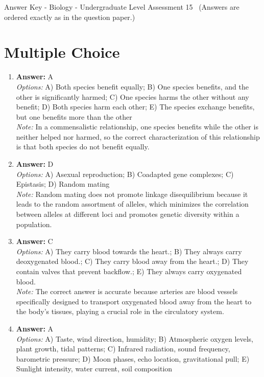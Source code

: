 \documentclass[12pt]{article}
\begin{document}
\begin{center}
Answer Key - Biology - Undergraduate Level Assessment 15 \
\small (Answers are ordered exactly as in the question paper.)
\end{center}

\section*{Multiple Choice}
\begin{enumerate}[label=\arabic*.]
\item \textbf{Answer:} A
\\ \textit{Options:} A) Both species benefit equally; B) One species benefits, and the other is significantly harmed; C) One species harms the other without any benefit; D) Both species harm each other; E) The species exchange benefits, but one benefits more than the other
\\ \textit{Note:} In a commensalistic relationship, one species benefits while the other is neither helped nor harmed, so the correct characterization of this relationship is that both species do not benefit equally.
\item \textbf{Answer:} D
\\ \textit{Options:} A) Asexual reproduction; B) Coadapted gene complexes; C) Epistasis; D) Random mating
\\ \textit{Note:} Random mating does not promote linkage disequilibrium because it leads to the random assortment of alleles, which minimizes the correlation between alleles at different loci and promotes genetic diversity within a population.
\item \textbf{Answer:} C
\\ \textit{Options:} A) They carry blood towards the heart.; B) They always carry deoxygenated blood.; C) They carry blood away from the heart.; D) They contain valves that prevent backflow.; E) They always carry oxygenated blood.
\\ \textit{Note:} The correct answer is accurate because arteries are blood vessels specifically designed to transport oxygenated blood away from the heart to the body's tissues, playing a crucial role in the circulatory system.
\item \textbf{Answer:} A
\\ \textit{Options:} A) Taste, wind direction, humidity; B) Atmospheric oxygen levels, plant growth, tidal patterns; C) Infrared radiation, sound frequency, barometric pressure; D) Moon phases, echo location, gravitational pull; E) Sunlight intensity, water current, soil composition

\end{enumerate}
\end{document}
